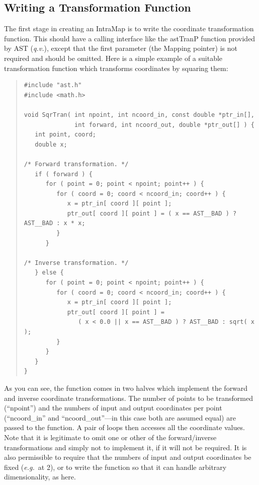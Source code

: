 \documentclass[twoside,11pt]{article}
\newcommand{\htmlref}[2]{#1}
\newcommand{\xlabel}[1]{}
\begin{document}
\subsection{\label{ss:transformationfunctions}Writing a Transformation Function}

The first stage in creating an \htmlref{IntraMap}{IntraMap} is to write the coordinate
transformation function. This should have a calling interface like the
\htmlref{astTranP}{astTranP} function provided by AST ({\em{q.v.}}), except that the first
parameter (the \htmlref{Mapping}{Mapping} pointer) is not required and should be
omitted. Here is a simple example of a suitable transformation
function which transforms coordinates by squaring them:
\xlabel{SqrTran}

\begin{quote}
\small
\begin{verbatim}
#include "ast.h"
#include <math.h>

void SqrTran( int npoint, int ncoord_in, const double *ptr_in[],
              int forward, int ncoord_out, double *ptr_out[] ) {
   int point, coord;
   double x;

/* Forward transformation. */
   if ( forward ) {
      for ( point = 0; point < npoint; point++ ) {
         for ( coord = 0; coord < ncoord_in; coord++ ) {
            x = ptr_in[ coord ][ point ];
            ptr_out[ coord ][ point ] = ( x == AST__BAD ) ? AST__BAD : x * x;
         }
      }

/* Inverse transformation. */
   } else {
      for ( point = 0; point < npoint; point++ ) {
         for ( coord = 0; coord < ncoord_in; coord++ ) {
            x = ptr_in[ coord ][ point ];
            ptr_out[ coord ][ point ] =
               ( x < 0.0 || x == AST__BAD ) ? AST__BAD : sqrt( x );
         }
      }
   }
}
\end{verbatim}
\normalsize
\end{quote}

As you can see, the function comes in two halves which implement the
forward and inverse coordinate transformations. The number of points
to be transformed (``npoint'') and the numbers of input and output
coordinates per point (``ncoord\_in'' and ``ncoord\_out''---in this
case both are assumed equal) are passed to the function. A pair of
loops then accesses all the coordinate values.  Note that it is
legitimate to omit one or other of the forward/inverse transformations
and simply not to implement it, if it will not be required. It is also
permissible to require that the numbers of input and output
coordinates be fixed ({\em{e.g.}}\ at 2), or to write the function so
that it can handle arbitrary dimensionality, as here.
\end{document}
